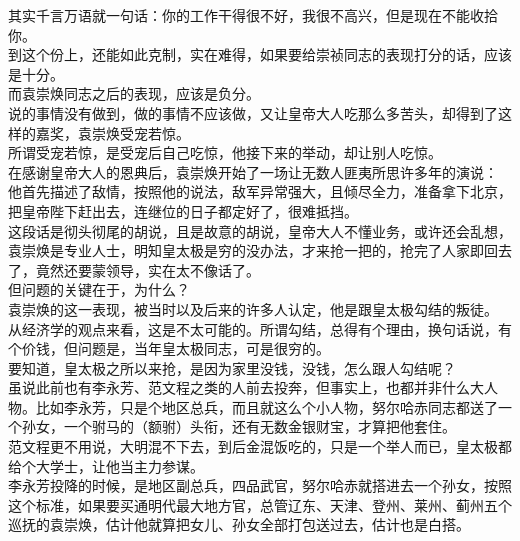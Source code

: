 \begin{multicols}{\theparacolNo}
其实千言万语就一句话：你的工作干得很不好，我很不高兴，但是现在不能收拾你。\\

到这个份上，还能如此克制，实在难得，如果要给崇祯同志的表现打分的话，应该是十分。\\

而袁崇焕同志之后的表现，应该是负分。\\

说的事情没有做到，做的事情不应该做，又让皇帝大人吃那么多苦头，却得到了这样的嘉奖，袁崇焕受宠若惊。\\

所谓受宠若惊，是受宠后自己吃惊，他接下来的举动，却让别人吃惊。\\

在感谢皇帝大人的恩典后，袁崇焕开始了一场让无数人匪夷所思许多年的演说：\\

他首先描述了敌情，按照他的说法，敌军异常强大，且倾尽全力，准备拿下北京，把皇帝陛下赶出去，连继位的日子都定好了，很难抵挡。\\

这段话是彻头彻尾的胡说，且是故意的胡说，皇帝大人不懂业务，或许还会乱想，袁崇焕是专业人士，明知皇太极是穷的没办法，才来抢一把的，抢完了人家即回去了，竟然还要蒙领导，实在太不像话了。\\

但问题的关键在于，为什么？\\

袁崇焕的这一表现，被当时以及后来的许多人认定，他是跟皇太极勾结的叛徒。\\

从经济学的观点来看，这是不太可能的。所谓勾结，总得有个理由，换句话说，有个价钱，但问题是，当年皇太极同志，可是很穷的。\\

要知道，皇太极之所以来抢，是因为家里没钱，没钱，怎么跟人勾结呢？\\

虽说此前也有李永芳、范文程之类的人前去投奔，但事实上，也都并非什么大人物。比如李永芳，只是个地区总兵，而且就这么个小人物，努尔哈赤同志都送了一个孙女，一个驸马的（额驸）头衔，还有无数金银财宝，才算把他套住。\\

范文程更不用说，大明混不下去，到后金混饭吃的，只是一个举人而已，皇太极都给个大学士，让他当主力参谋。\\

李永芳投降的时候，是地区副总兵，四品武官，努尔哈赤就搭进去一个孙女，按照这个标准，如果要买通明代最大地方官，总管辽东、天津、登州、莱州、蓟州五个巡抚的袁崇焕，估计他就算把女儿、孙女全部打包送过去，估计也是白搭。\\


\end{multicols}
